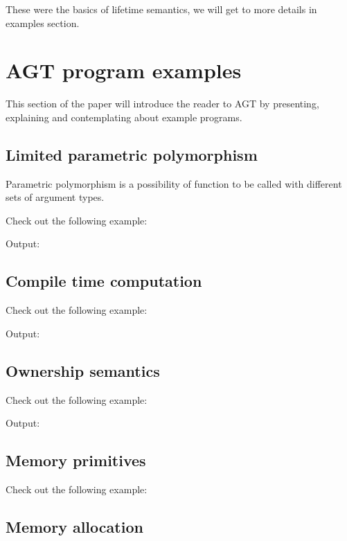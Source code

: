 \documentclass[times, utf8, diplomski]{fer}
\theoremstyle{definition}
\newcommand{\textcode}[3]{
    
}
\begin{document}
These were the basics of lifetime semantics, we will get to more details in examples section.



\chapter{AGT program examples}

This section of the paper will introduce the reader to AGT by presenting, explaining and contemplating
about example programs.

\section{Limited parametric polymorphism}

Parametric polymorphism is a possibility of function to be called with different sets of argument types.

Check out the following example:
\textcode{\resdir/programs/fib_runtime_recursion.agt}{}{a}

Output:
\textcode{\resdir/programs/fib_runtime_recursion.out}{}{a}


\section{Compile time computation}

Check out the following example:
\textcode{\resdir/programs/fib_compile_time.agt}{}{a}

Output:
\textcode{\resdir/programs/fib_compile_time.out}{}{a}


\section{Ownership semantics}

Check out the following example:
\textcode{\resdir/programs/shared_pointer.agt}{}{a}

Output:
\textcode{\resdir/programs/shared_pointer.out}{}{a}

\section{Memory primitives}

Check out the following example:
\textcode{\resdir/programs/memory_object.agt}{}{a}

\section{Memory allocation}
\end{document}
